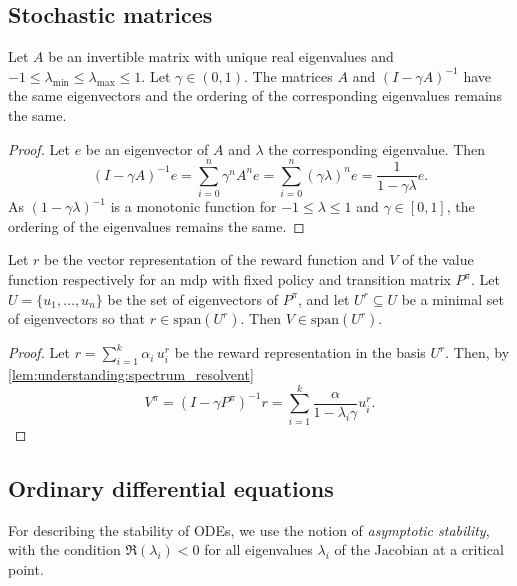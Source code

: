 \subsection{Stochastic matrices}
\begin{lemma}\label{lem:understanding:spectrum_resolvent}
    Let $A$ be an invertible matrix with unique real eigenvalues and $-1 \leq \lambda_{\min} \leq \lambda_{\max} \leq 1 $. Let $\gamma\in(0,1)$.
    The matrices $A$ and $(I - \gamma A)^{-1}$ have the same eigenvectors and the ordering of the corresponding eigenvalues remains the same.
\end{lemma}

\begin{proof}
    Let $e$ be an eigenvector of $A$ and $\lambda$ the corresponding eigenvalue. Then $$(I - \gamma A)^{-1}e = \sum_{i=0}^n \gamma^n A^ne = \sum_{i=0}^n (\gamma\lambda)^n e = \frac{1}{1 - \gamma\lambda}e.$$ As $(1-\gamma\lambda)^{-1}$ is a monotonic function for $-1 \leq \lambda \leq 1$ and $\gamma\in[0,1]$, the ordering of the eigenvalues remains the same.
\end{proof}

\begin{lemma}\label{lem:understanding:spectrum_rew_value}
    Let $r$ be the vector representation of the reward function and $V$ of the value function respectively for an \ac{mdp}   with fixed policy and transition matrix $P^\pi$.
    Let $U = \{u_1,\dots,u_n\}$ be the set of eigenvectors of $P^\pi$, and let $U^r \subseteq U$ be a minimal set of eigenvectors so that $r \in \mathrm{span}(U^r)$.
    Then $V \in \mathrm{span}(U^r)$.
\end{lemma}
\begin{proof}
    Let $r = \sum_{i=1}^k \alpha_i\, u^r_i$ be the reward representation in the basis $U^r$. Then, by \autoref{lem:understanding:spectrum_resolvent} $$V^\pi = (I - \gamma P^\pi)^{-1} r = \sum_{i=1}^k \frac{\alpha}{1 - \lambda_i\gamma}  u^r_i.$$
\end{proof}


\subsection{Ordinary differential equations}

For describing the stability of ODEs, we use the notion of \emph{asymptotic stability}, with the condition $\Re(\lambda_i) < 0$ for all eigenvalues $\lambda_i$ of the Jacobian at a critical point.

